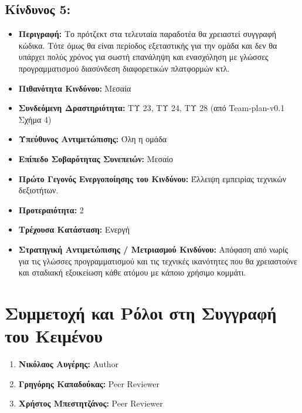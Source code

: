 \documentclass[12pt,a4paper]{article}
\begin{document}
\subsection*{Κίνδυνος 5:}
\begin{itemize}
	\item \textbf{Περιγραφή:} Το πρότζεκτ στα τελευταία παραδοτέα θα χρειαστεί συγγραφή κώδικα. Τότε όμως θα είναι περίοδος εξεταστικής για την ομάδα και δεν θα υπάρχει πολύς χρόνος για σωστή επανάληψη και ενασχόληση με γλώσσες προγραμματισμού διασύνδεση διαφορετικών πλατφορμών κτλ.
	\item \textbf{Πιθανότητα Κινδύνου:} Μεσαία
	\item \textbf{Συνδεόμενη Δραστηριότητα:} ΤΥ 23, ΤΥ 24, ΤΥ 28 (από Team-plan-v0.1 Σχήμα 4)
	\item \textbf{Υπεύθυνος Αντιμετώπισης:} Όλη η ομάδα
	\item \textbf{Επίπεδο Σοβαρότητας Συνεπειών:} Μεσαίο
	\item \textbf{Πρώτο Γεγονός Ενεργοποίησης του Κινδύνου:} Έλλειψη εμπειρίας τεχνικών δεξιοτήτων.
	\item \textbf{Προτεραιότητα:} 2
	\item \textbf{Τρέχουσα Κατάσταση:} Ενεργή
	\item \textbf{Στρατηγική Αντιμετώπισης / Μετριασμού Κινδύνου:} Απόφαση από νωρίς για τις γλώσσες προγραμματισμού και τις τεχνικές ικανότητες που θα χρειαστούνε και σταδιακή εξοικείωση κάθε ατόμου με κάποιο χρήσιμο κομμάτι.
\end{itemize}

\section{Συμμετοχή και Ρόλοι στη Συγγραφή του Κειμένου}
\begin{enumerate}
	\item \textbf{Νικόλαος Αυγέρης:} Author
	\item \textbf{Γρηγόρης Καπαδούκας:} Peer Reviewer
	\item \textbf{Χρήστος Μπεστητζάνος:} Peer Reviewer
\end{enumerate}
\end{document}
